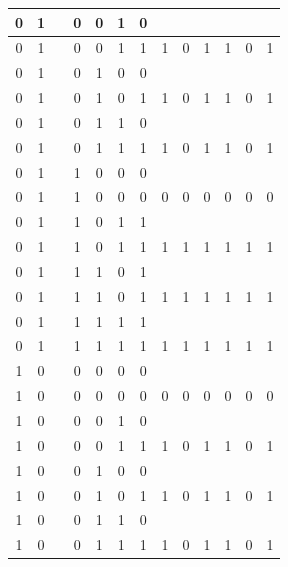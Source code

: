 \begin{table}[!tb]
\begin{tabular}{|c|c|c|c|c|c|c|c|c|c|c|c|c|}
        \rowcolor{yellow!40} 0 & 1 &  & 0 & 0 & 1 & 0 &  &  &  &  &  &  \\ \hline
        \rowcolor{yellow!40} 0 & 1 &  & 0 & 0 & 1 & 1 & 1 & 0 & 1 & 1 & 0 & 1 \\ \hline
        \rowcolor{gray!40} 0 & 1 &  & 0 & 1 & 0 & 0 &  &  &  &  &  &  \\ \hline
        \rowcolor{gray!40} 0 & 1 &  & 0 & 1 & 0 & 1 & 1 & 0 & 1 & 1 & 0 & 1 \\ \hline
        \rowcolor{blue!40} 0 & 1 &  & 0 & 1 & 1 & 0 &  &  &  &  &  &  \\ \hline
        \rowcolor{blue!40} 0 & 1 &  & 0 & 1 & 1 & 1 & 1 & 0 & 1 & 1 & 0 & 1 \\ \hline
        \rowcolor{red!40} 0 & 1 &  & 1 & 0 & 0 & 0 &  &  &  &  &  &  \\ \hline
        \rowcolor{red!40} 0 & 1 &  & 1 & 0 & 0 & 0 & 0 & 0 & 0 & 0 & 0 & 0 \\ \hline
        \rowcolor{green!40} 0 & 1 &  & 1 & 0 & 1 & 1 &  &  &  &  &  &  \\ \hline
        \rowcolor{green!40} 0 & 1 &  & 1 & 0 & 1 & 1 & 1 & 1 & 1 & 1 & 1 & 1 \\ \hline
        \rowcolor{yellow!40} 0 & 1 &  & 1 & 1 & 0 & 1 &  &  &  &  &  &  \\ \hline
        \rowcolor{yellow!40} 0 & 1 &  & 1 & 1 & 0 & 1 & 1 & 1 & 1 & 1 & 1 & 1 \\ \hline
        \rowcolor{gray!40} 0 & 1 &  & 1 & 1 & 1 & 1 &  &  &  &  &  &  \\ \hline
        \rowcolor{gray!40} 0 & 1 &  & 1 & 1 & 1 & 1 & 1 & 1 & 1 & 1 & 1 & 1 \\ \hline
        \rowcolor{blue!40} 1 & 0 &  & 0 & 0 & 0 & 0 &  &  &  &  &  &  \\ \hline
        \rowcolor{blue!40} 1 & 0 &  & 0 & 0 & 0 & 0 & 0 & 0 & 0 & 0 & 0 & 0 \\ \hline
        \rowcolor{red!40} 1 & 0 &  & 0 & 0 & 1 & 0 &  &  &  &  &  &  \\ \hline
        \rowcolor{red!40} 1 & 0 &  & 0 & 0 & 1 & 1 & 1 & 0 & 1 & 1 & 0 & 1 \\ \hline
        \rowcolor{green!40} 1 & 0 &  & 0 & 1 & 0 & 0 &  &  &  &  &  &  \\ \hline
        \rowcolor{green!40} 1 & 0 &  & 0 & 1 & 0 & 1 & 1 & 0 & 1 & 1 & 0 & 1 \\ \hline
        \rowcolor{yellow!40} 1 & 0 &  & 0 & 1 & 1 & 0 &  &  &  &  &  &  \\ \hline
        \rowcolor{yellow!40} 1 & 0 &  & 0 & 1 & 1 & 1 & 1 & 0 & 1 & 1 & 0 & 1 \\ \hline

\end{tabular}
\end{table}
